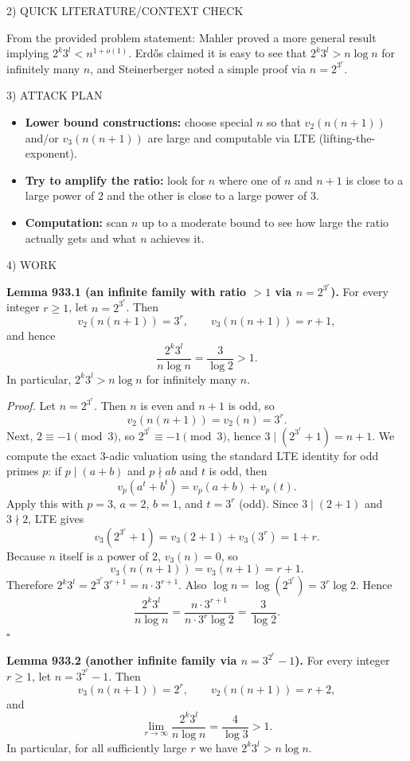 2) QUICK LITERATURE/CONTEXT CHECK

From the provided problem statement: Mahler proved a more general result implying $2^k3^l<n^{1+o(1)}$. Erd\H{o}s claimed it is easy to see that $2^k3^l>n\log n$ for infinitely many $n$, and Steinerberger noted a simple proof via $n=2^{3^r}$.

3) ATTACK PLAN

\begin{itemize}
\item \textbf{Lower bound constructions:} choose special $n$ so that $v_2(n(n+1))$ and/or $v_3(n(n+1))$ are large and computable via LTE (lifting-the-exponent).
\item \textbf{Try to amplify the ratio:} look for $n$ where one of $n$ and $n+1$ is close to a large power of $2$ and the other is close to a large power of $3$.
\item \textbf{Computation:} scan $n$ up to a moderate bound to see how large the ratio actually gets and what $n$ achieves it.
\end{itemize}

4) WORK

\textbf{Lemma 933.1 (an infinite family with ratio $>1$ via $n=2^{3^r}$).}
For every integer $r\ge 1$, let $n=2^{3^r}$. Then
\[
 v_2(n(n+1))=3^r,\qquad v_3(n(n+1))=r+1,
\]
and hence
\[
\frac{2^k3^l}{n\log n}=\frac{3}{\log 2}>1.
\]
In particular, $2^k3^l>n\log n$ for infinitely many $n$.

\emph{Proof.}
Let $n=2^{3^r}$. Then $n$ is even and $n+1$ is odd, so
\[
v_2(n(n+1))=v_2(n)=3^r.
\]
Next, $2\equiv -1\pmod 3$, so $2^{3^r}\equiv -1\pmod 3$, hence $3\mid (2^{3^r}+1)=n+1$.
We compute the exact 3-adic valuation using the standard LTE identity for odd primes $p$:
if $p\mid (a+b)$ and $p\nmid ab$ and $t$ is odd, then
\[
 v_p(a^t+b^t)=v_p(a+b)+v_p(t).
\]
Apply this with $p=3$, $a=2$, $b=1$, and $t=3^r$ (odd).
Since $3\mid (2+1)$ and $3\nmid 2$, LTE gives
\[
 v_3(2^{3^r}+1)=v_3(2+1)+v_3(3^r)=1+r.
\]
Because $n$ itself is a power of $2$, $v_3(n)=0$, so
\[
 v_3(n(n+1))=v_3(n+1)=r+1.
\]
Therefore $2^k3^l=2^{3^r}3^{r+1}=n\cdot 3^{r+1}$.
Also $\log n = \log(2^{3^r})=3^r\log 2$.
Hence
\[
\frac{2^k3^l}{n\log n}=\frac{n\cdot 3^{r+1}}{n\cdot 3^r\log 2}=\frac{3}{\log 2}.
\]
\hfill$\square$

\medskip
\textbf{Lemma 933.2 (another infinite family via $n=3^{2^r}-1$).}
For every integer $r\ge 1$, let $n=3^{2^r}-1$. Then
\[
 v_3(n(n+1))=2^r,\qquad v_2(n(n+1))=r+2,
\]
and
\[
\lim_{r\to\infty}\frac{2^k3^l}{n\log n}=\frac{4}{\log 3}>1.
\]
In particular, for all sufficiently large $r$ we have $2^k3^l>n\log n$.

